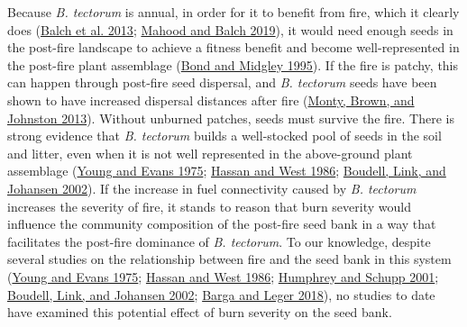 \documentclass[
  12pt,
]{article}
\begin{document}
Because \emph{B. tectorum} is annual, in order for it to benefit from
fire, which it clearly does (\protect\hyperlink{ref-Balch2013}{Balch et
al. 2013}; \protect\hyperlink{ref-Mahood2019}{Mahood and Balch 2019}),
it would need enough seeds in the post-fire landscape to achieve a
fitness benefit and become well-represented in the post-fire plant
assemblage (\protect\hyperlink{ref-Bond1995}{Bond and Midgley 1995}). If
the fire is patchy, this can happen through post-fire seed dispersal,
and \emph{B. tectorum} seeds have been shown to have increased dispersal
distances after fire (\protect\hyperlink{ref-Monty2013}{Monty, Brown,
and Johnston 2013}). Without unburned patches, seeds must survive the
fire. There is strong evidence that \emph{B. tectorum} builds a
well-stocked pool of seeds in the soil and litter, even when it is not
well represented in the above-ground plant assemblage
(\protect\hyperlink{ref-Young1975}{Young and Evans 1975};
\protect\hyperlink{ref-Hassan1986}{Hassan and West 1986};
\protect\hyperlink{ref-Boudell2002}{Boudell, Link, and Johansen 2002}).
If the increase in fuel connectivity caused by \emph{B. tectorum}
increases the severity of fire, it stands to reason that burn severity
would influence the community composition of the post-fire seed bank in
a way that facilitates the post-fire dominance of \emph{B. tectorum}. To
our knowledge, despite several studies on the relationship between fire
and the seed bank in this system
(\protect\hyperlink{ref-Young1975}{Young and Evans 1975};
\protect\hyperlink{ref-Hassan1986}{Hassan and West 1986};
\protect\hyperlink{ref-Humphrey2001}{Humphrey and Schupp 2001};
\protect\hyperlink{ref-Boudell2002}{Boudell, Link, and Johansen 2002};
\protect\hyperlink{ref-Barga2018}{Barga and Leger 2018}), no studies to
date have examined this potential effect of burn severity on the seed
bank.
\end{document}
